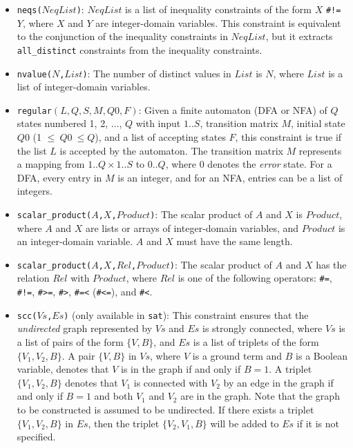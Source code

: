 \begin{itemize}
\item \texttt{neqs($NeqList$)}: $NeqList$ is a list of inequality constraints of the form $X$ \verb+#!=+ $Y$, where $X$ and $Y$ are integer-domain variables. This constraint is equivalent to the conjunction of the inequality constraints in $NeqList$, but it extracts \texttt{all\_distinct} constraints from the inequality constraints. 

\item \texttt{nvalue($N$,$List$)}: The number of distinct values in $List$ is $N$, where $List$ is a list of integer-domain variables.

\item \texttt{regular$(L, Q, S, M, Q0, F)$}:  Given a finite automaton (DFA or NFA) of $Q$ states numbered 1, 2, $\ldots$, $Q$ with input $1..S$, transition matrix $M$, initial state $Q0$ (1 $\le\ Q0\ \le Q$), and a list of accepting states $F$, this constraint is true if the list $L$ is accepted by the automaton. The transition matrix $M$ represents a mapping from $1..Q\times 1..S$ to $0..Q$, where $0$ denotes the {\it error} state.  For a DFA, every entry in $M$ is an integer, and for an NFA, entries can be a list of integers.

\item \texttt{scalar\_product($A$,$X$,$Product$)}: The scalar product of $A$ and $X$ is $Product$, where $A$ and $X$ are lists or arrays of integer-domain variables, and $Product$ is an integer-domain variable. $A$ and $X$ must have the same length.

\item \texttt{scalar\_product($A$,$X$,$Rel$,$Product$)}: The scalar product of $A$ and $X$ has the relation $Rel$ with $Product$, where $Rel$ is one of the following operators: \verb+#=+, \verb+#!=+, \verb+#>=+, \verb+#>+, \verb+#=<+ (\verb+#<=+), and \verb+#<+. 

\item \texttt{scc($Vs$,$Es$)} (only available in \texttt{sat}): This constraint ensures that the \textit{undirected} graph represented by $Vs$ and $Es$ is strongly connected, where $Vs$ is a list of pairs of the form $\{V,B\}$, and $Es$ is a list of triplets of the form $\{V_1,V_2,B\}$. A pair $\{V,B\}$ in $Vs$, where $V$ is a ground term and $B$ is a Boolean variable, denotes that $V$ is in the graph if and only if $B = 1$. A triplet $\{V_1,V_2,B\}$ denotes that $V_1$ is connected with $V_2$  by an edge in the graph if and only if $B = 1$ and both $V_1$ and $V_2$ are in the graph. Note that the graph to be constructed is assumed to be undirected. If there exists a triplet $\{V_1,V_2,B\}$ in $Es$, then the triplet $\{V_2,V_1,B\}$ will be added to $Es$ if it is not specified.


\end{itemize}
